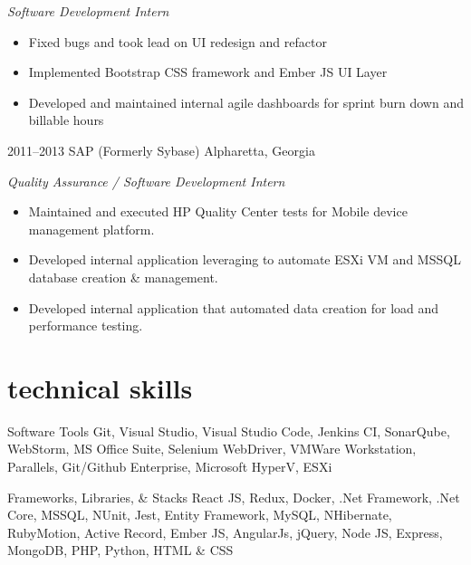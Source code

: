 \documentclass[]{friggeri-cv} %
\begin{document}
\begin{entrylist}
{  \emph{Software Development Intern}
  \begin{itemize}
    \item Fixed bugs and took lead on UI redesign and refactor
    \item Implemented Bootstrap CSS framework and Ember JS UI Layer
    \item Developed and maintained internal agile dashboards for sprint burn down and billable hours
  \end{itemize}
}
\entry
{2011--2013}
{SAP (Formerly Sybase)}
{Alpharetta, Georgia}
{\raggedright
  \emph{Quality Assurance / Software Development Intern}
  \begin{itemize}
    \item Maintained and executed HP Quality Center tests for Mobile device management platform.
    \item Developed internal application leveraging to automate ESXi VM and MSSQL database creation \& management.
    \item Developed internal application that automated data creation for load and performance testing. 
  \end{itemize}
}

\end{entrylist}

\pagebreak


\section{technical skills}
\begin{entrylist}
\entry
{}
{Software Tools}
{}
{Git, Visual Studio, Visual Studio Code, Jenkins CI, SonarQube, WebStorm, MS Office Suite, 
Selenium WebDriver, VMWare Workstation, Parallels, Git/Github Enterprise, Microsoft HyperV, ESXi}

\entry
{}
{Frameworks, Libraries, \& Stacks}
{}
{React JS, Redux, Docker, .Net Framework, .Net Core, MSSQL, NUnit, Jest, Entity Framework, MySQL, NHibernate, 
RubyMotion, Active Record, Ember JS, AngularJs, jQuery, Node JS, Express, MongoDB, PHP, Python, HTML \& CSS}
\end{entrylist}
\end{document}
